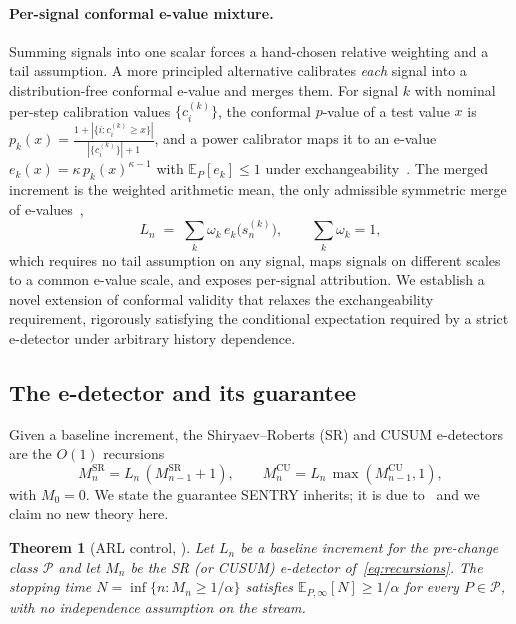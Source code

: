 \documentclass[10pt,journal,compsoc]{IEEEtran}
\theoremstyle{plain}
\newtheorem{theorem}{Theorem}
\theoremstyle{definition}
\newcommand{\Ecal}{\mathbb{E}}
\newcommand{\Pcal}{\mathcal{P}}
\begin{document}
\paragraph{Per-signal conformal e-value mixture.} Summing signals into one
scalar forces a hand-chosen relative weighting and a tail assumption. A more
principled alternative calibrates \emph{each} signal into a distribution-free
conformal e-value and merges them. For signal \(k\) with nominal
per-step calibration values \(\{c^{(k)}_i\}\), the conformal
\(p\)-value of a test value \(x\) is
\(p_k(x)=\frac{1+|\{i:c^{(k)}_i\ge x\}|}{|\{c^{(k)}_i\}|+1}\), and a
power calibrator maps it to an e-value \(e_k(x)=\kappa\,p_k(x)^{\kappa-1}\)
with \(\Ecal_P[e_k]\le 1\) under exchangeability~\cite{vovk2021evalues}. The
merged increment is the weighted arithmetic mean, the only admissible
symmetric merge of e-values~\cite{vovk2021evalues},
\begin{equation}
L_n \;=\; \sum_{k} \omega_k\, e_k\!\bigl(s^{(k)}_n\bigr),
\qquad \sum_k \omega_k = 1,
\label{eq:evalue-mix}
\end{equation}
which requires no tail assumption on any signal, maps signals on different 
scales to a common e-value scale, and exposes per-signal attribution. We establish 
a novel extension of conformal validity that relaxes the exchangeability requirement, 
rigorously satisfying the conditional expectation required by a strict e-detector 
under arbitrary history dependence.

\subsection{The e-detector and its guarantee}

Given a baseline increment, the Shiryaev--Roberts (SR) and CUSUM e-detectors
are the \(O(1)\) recursions~\cite{shin2023edetectors}
\begin{equation}
M^{\mathrm{SR}}_n = L_n\,(M^{\mathrm{SR}}_{n-1}+1), \qquad
M^{\mathrm{CU}}_n = L_n\,\max(M^{\mathrm{CU}}_{n-1},1),
\label{eq:recursions}
\end{equation}
with \(M_0=0\). We state the guarantee SENTRY inherits; it is due
to~\cite{shin2023edetectors} and we claim no new theory here.

\begin{theorem}[ARL control, {\cite[Thm.~2.4]{shin2023edetectors}}]
\label{thm:arl}
Let \(L_n\) be a baseline increment for the pre-change class \(\Pcal\) and let
\(M_n\) be the SR (or CUSUM) e-detector of~\eqref{eq:recursions}. The stopping
time \(N=\inf\{n: M_n\ge 1/\alpha\}\) satisfies \(\Ecal_{P,\infty}[N]\ge
1/\alpha\) for every \(P\in\Pcal\), with no independence assumption on the
stream.
\end{theorem}
\end{document}
